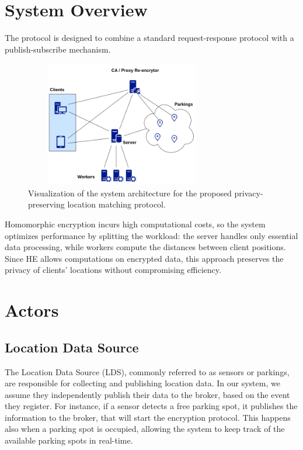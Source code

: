 \section{System Overview}
The protocol is designed to combine a standard request-response protocol with a publish-subscribe mechanism.


\begin{figure}[h]
    \centering
    \includegraphics[width=8.5cm,height=5.5cm]{img/architecture-scheme.png}
    \caption{Visualization of the system architecture for the proposed privacy-preserving location matching protocol.}
    \label{fig:architecture}
\end{figure}

Homomorphic encryption incurs high computational costs, so the system optimizes performance by splitting the workload: the server handles only essential data processing, while workers compute the distances between client positions. Since HE allows computations on encrypted data, this approach preserves the privacy of clients' locations without compromising efficiency.

\section{Actors}

\subsection{Location Data Source}
The Location Data Source (LDS), commonly referred to as sensors or parkings, are responsible for collecting and publishing location data. In our system, we assume they independently publish their data to the broker, based on the event they register. For instance, if a sensor detects a free parking spot, it publishes the information to the broker, that will start the encryption protocol. This happens also when a parking spot is occupied, allowing the system to keep track of the available parking spots in real-time.

